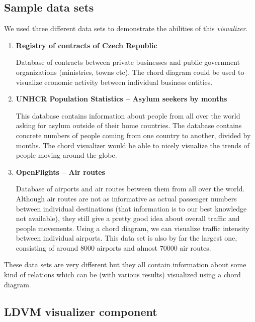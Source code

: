 
\subsection{Sample data sets}
\label{sec:visualizers:chord:data-sets}

We used three different data sets to demonstrate the abilities of this \emph{visualizer}.

\begin{enumerate}

\item \textbf{Registry of contracts of Czech Republic} \cite{registry-of-contracts}

Database of contracts between private businesses and public government organizations (ministries, towns etc). The chord diagram could be used to visualize economic activity between individual business entities.

\item \textbf{UNHCR Population Statistics – Asylum seekers by months} \cite{asylum-seekers}

This database contains information about people from all over the world asking for asylum outside of their home countries. The database contains concrete numbers of people coming from one country to another, divided by months. The chord visualizer would be able to nicely visualize the trends of people moving around the globe.

\item \textbf{OpenFlights – Air routes} \cite{openflights}

Database of airports and air routes between them from all over the world. Although air routes are not as informative as actual passenger numbers between individual destinations (that information is to our best knowledge not available), they still give a pretty good idea about overall traffic and people movements. Using a chord diagram, we can visualize traffic intensity between individual airports. This data set is also by far the largest one, consisting of around 8000 airports and almost 70000 air routes.

\end{enumerate}
These data sets are very different but they all contain information about some kind of relations which can be (with various results) visualized using a chord diagram. 

\subsection{LDVM visualizer component}

